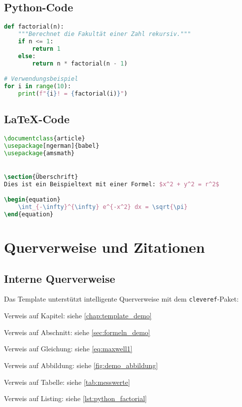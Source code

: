 \subsection*{Python-Code}
\label{subsec:python_code}

\begin{lstlisting}[caption={Python-Beispiel: Fakultätsfunktion},label={lst:python_factorial},language=Python]
def factorial(n):
    """Berechnet die Fakultät einer Zahl rekursiv."""
    if n <= 1:
        return 1
    else:
        return n * factorial(n - 1)

# Verwendungsbeispiel
for i in range(10):
    print(f"{i}! = {factorial(i)}")
\end{lstlisting}

\subsection*{LaTeX-Code}
\label{subsec:latex_code}

\begin{lstlisting}[caption={LaTeX-Beispiel: Dokumentstruktur},label={lst:latex_example},language=TeX]
\documentclass{article}
\usepackage[ngerman]{babel}
\usepackage{amsmath}


\section{Überschrift}
Dies ist ein Beispieltext mit einer Formel: $x^2 + y^2 = r^2$

\begin{equation}
    \int_{-\infty}^{\infty} e^{-x^2} dx = \sqrt{\pi}
\end{equation}

\end{lstlisting}

\section{Querverweise und Zitationen}
\label{sec:querverweise}

\subsection*{Interne Querverweise}
\label{subsec:querverweise_intern}

Das Template unterstützt intelligente Querverweise mit dem \texttt{cleveref}-Paket:
\begin{listenabsatz}
	\item Verweis auf Kapitel: siehe \cref{chap:template_demo}
	\item Verweis auf Abschnitt: siehe \cref{sec:formeln_demo}
	\item Verweis auf Gleichung: siehe \cref{eq:maxwell1}
	\item Verweis auf Abbildung: siehe \cref{fig:demo_abbildung}
	\item Verweis auf Tabelle: siehe \cref{tab:messwerte}
	\item Verweis auf Listing: siehe \cref{lst:python_factorial}
\end{listenabsatz}

